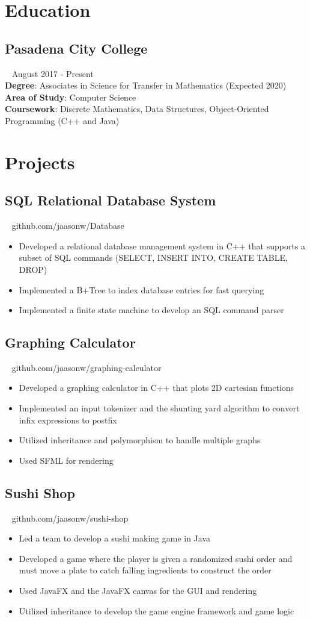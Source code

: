 \documentclass{article}
\newcommand{\resumesection}[3]{
    \subsection*{#1}
    \ 
    \footnotesize
    \textcolor{wordgrey}{#2}
    \normalsize
    \hfill
    \textcolor{wordgrey}{#3}
}
\begin{document}
\pagestyle{useheader}

\section*{Education}
\resumesection{Pasadena City College}{}{August 2017 - Present}\\
\textbf{Degree}: Associates in Science for Transfer in Mathematics (Expected 2020)\\
\textbf{Area of Study}: Computer Science\\
\textbf{Coursework}: Discrete Mathematics, Data Structures, Object-Oriented Programming (C++ and Java)
\\
\section*{Projects}
\resumesection{SQL Relational Database System}{}{github.com/jaasonw/Database}
\begin{itemize}
    \item Developed a relational database management system in C++ that supports a subset of SQL commands (SELECT, INSERT INTO, CREATE TABLE, DROP) 
    \item Implemented a B+Tree to index database entries for fast querying
    \item Implemented a finite state machine to develop an SQL command parser
\end{itemize}

\resumesection{Graphing Calculator}{}{github.com/jaasonw/graphing-calculator}
\begin{itemize}
    \item Developed a graphing calculator in C++ that plots 2D cartesian functions
    \item Implemented an input tokenizer and the shunting yard algorithm to convert infix expressions to postfix
    \item Utilized inheritance and polymorphism to handle multiple graphs
    \item Used SFML for rendering
\end{itemize}

\resumesection{Sushi Shop}{}{github.com/jaasonw/sushi-shop}
\begin{itemize}
    \item Led a team to develop a sushi making game in Java
    \item Developed a game where the player is given a randomized sushi order and must move a plate to catch falling ingredients to construct the order
    \item Used JavaFX and the JavaFX canvas for the GUI and rendering
    \item Utilized inheritance to develop the game engine framework and game logic
\end{itemize}
\hfill
\end{document}
